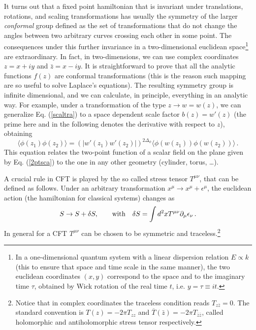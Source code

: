 \documentclass[12pt]{article}
\def\be{\begin{equation}}
\def\ee{\end{equation}}
\begin{document}
It turns out that a fixed point hamiltonian that is invariant under
translations, rotations, and scaling transformations has usually the symmetry 
of the larger {\it conformal} group\cite{confbook} defined as the set of 
transformations that do not change the angles between two arbitrary curves 
crossing each other in some point.
The consequences under this further invariance in a two-dimensional 
euclidean space\footnote{In a one-dimensional quantum system with a linear
dispersion relation $E\propto k$ (this to ensure that space and time scale 
in the same manner), the two euclidean coordinates $(x,y)$ correspond to the 
space and to the imaginary time $\tau$, obtained by Wick rotation of the real
 time $t$, i.e. $y=\tau\equiv i t$.}
 are extraordinary. 
In fact, in two-dimensions, we can use complex coordinates $z=x+iy$ and
$\bar{z}=x-iy$.
It is straightforward to prove that all the analytic functions $f(z)$ 
are conformal transformations (this is the reason such mapping are so useful 
to solve Laplace's equations).
The resulting symmetry group is infinite dimensional, and we can calculate, 
in principle, everything in an analytic way. 
For example, under a transformation of the type $z\to w=w(z)$, 
we can generalize Eq. (\ref{scaltra}) to a space dependent 
scale factor $b(z)=w'(z)$ (the prime here and in the following denotes the
derivative with respect to $z$), obtaining
\be
\langle \phi(z_1) \phi(z_2) \rangle=
(|w'(z_1)w'(z_2)|)^{2 \Delta_\phi} 
\langle \phi(w(z_1)) \phi(w(z_2))\rangle\,.
\label{2pt}
\ee
This equation relates the two-point function of a scalar field
on the plane given by Eq. (\ref{2ptsca}) to 
the one in any other geometry (cylinder, torus, \dots).

A crucial rule in CFT is played by the so called stress tensor $T^{\mu\nu}$, 
that can be defined as follows. 
Under an arbitrary transformation $x^\mu\to x^\mu+\epsilon^\mu$,
the euclidean action (the hamiltonian for classical systems) changes as
\be
S\to S+\delta S, \qquad {\rm with }\quad \delta S=
\int d^2x T^{\mu\nu} \partial_\mu\epsilon_\nu\,.
\ee
In general for a CFT $T^{\mu\nu}$ can be chosen to be symmetric and 
traceless.\footnote{Notice that in complex coordinates the traceless condition
reads $T_{z\bar z}=0$. The standard convention is $T(z)=-2\pi T_{zz}$ and
$\overline{T}(\bar{z})=-2\pi T_{\bar{z}\bar{z}}$, called holomorphic 
and antiholomorphic stress tensor respectively.\cite{confbook}}
\end{document}
